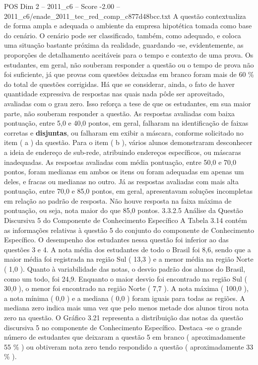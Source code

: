 \begin{textsample}{POS Dim 2 – 2011\_c6 – Score -2.00 – 2011\_c6/enade\_2011\_tec\_red\_comp\_c877d48bcc.txt}
A questão contextualiza de forma ampla e adequada o ambiente da empresa hipotética tomada como base do cenário.
O cenário pode ser classificado, também, como adequado, e coloca uma situação bastante próxima da realidade, guardando -se, evidentemente, as proporções de detalhamento aceitáveis para o tempo e contexto de uma prova.
Os estudantes, em geral, não souberam responder a questão ou o tempo de prova não foi suficiente, já que provas com questões deixadas em branco foram mais de 60 \% do total de questões corrigidas.
Há que se considerar, ainda, o fato de haver quantidade expressiva de respostas nas quais nada pôde ser aproveitado, avaliadas com o grau zero.
Isso reforça a tese de que os estudantes, em sua maior parte, não souberam responder a questão.
As respostas avaliadas com baixa pontuação, entre 5,0 e 40,0 pontos, em geral, falharam na identificação de faixas corretas e \textbf{disjuntas}, ou falharam em exibir a máscara, conforme solicitado no item ( a ) da questão.
Para o item ( b ), vários alunos demonstraram desconhecer a ideia de endereço de sub-rede, atribuindo endereços específicos, ou máscaras inadequadas.
As respostas avaliadas com média pontuação, entre 50,0 e 70,0 pontos, foram medianas em ambos os itens ou foram adequadas em apenas um deles, e fracas ou medianas no outro.
Já as respostas avaliadas com mais alta pontuação, entre 70,0 e 85,0 pontos, em geral, apresentavam soluções incompletas em relação ao padrão de resposta.
Não houve resposta na faixa máxima de pontuação, ou seja, nota maior do que 85,0 pontos. 3.3.2.5 Análise da Questão Discursiva 5 do Componente de Conhecimento Específico A Tabela 3.14 contém as informações relativas à questão 5 do conjunto do componente de Conhecimento Específico.
O desempenho dos estudantes nessa questão foi inferior ao das questões 3 e 4.
A nota média dos estudantes de todo o Brasil foi 8,6, sendo que a maior média foi registrada na região Sul ( 13,3 ) e a menor média na região Norte ( 1,0 ).
Quanto à variabilidade das notas, o desvio padrão dos alunos do Brasil, como um todo, foi 24,9.
Enquanto o maior desvio foi encontrado na região Sul ( 30,0 ), o menor foi encontrado na região Norte ( 7,7 ).
A nota máxima ( 100,0 ), a nota mínima ( 0,0 ) e a mediana ( 0,0 ) foram iguais para todas as regiões.
A mediana zero indica mais uma vez que pelo menos metade dos alunos tirou nota zero na questão.
O Gráfico 3.21 representa a distribuição das notas da questão discursiva 5 no componente de Conhecimento Específico.
Destaca -se o grande número de estudantes que deixaram a questão 5 em branco ( aproximadamente 55 \% ) ou obtiveram nota zero tendo respondido a questão ( aproximadamente 33 \% ).

\end{textsample}
